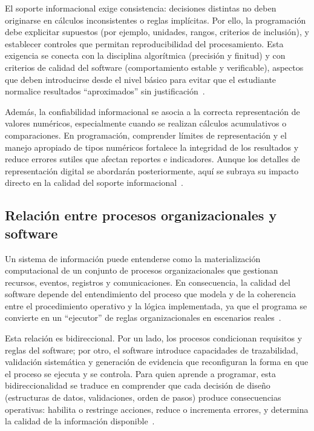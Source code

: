 \documentclass[12pt,twoside]{book}
\begin{document}
						El soporte informacional exige consistencia: decisiones distintas no deben originarse en cálculos inconsistentes o reglas implícitas. Por ello, la programación debe explicitar supuestos (por ejemplo, unidades, rangos, criterios de inclusión), y establecer controles que permitan reproducibilidad del procesamiento. Esta exigencia se conecta con la disciplina algorítmica (precisión y finitud) y con criterios de calidad del software (comportamiento estable y verificable), aspectos que deben introducirse desde el nivel básico para evitar que el estudiante normalice resultados “aproximados” sin justificación~\cite{Wirth1976Algorithms,Ghezzi2003Fundamentals,Fitzpatrick2004Software}.
						
						Además, la confiabilidad informacional se asocia a la correcta representación de valores numéricos, especialmente cuando se realizan cálculos acumulativos o comparaciones. En programación, comprender límites de representación y el manejo apropiado de tipos numéricos fortalece la integridad de los resultados y reduce errores sutiles que afectan reportes e indicadores. Aunque los detalles de representación digital se abordarán posteriormente, aquí se subraya su impacto directo en la calidad del soporte informacional~\cite{IEEE2019Standard754,Goldberg1991What,Gaddis2022Starting}.
					
				\subsection{Relación entre procesos organizacionales y software}
					\noindent
					Un sistema de información puede entenderse como la materialización computacional de un conjunto de procesos organizacionales que gestionan recursos, eventos, registros y comunicaciones. En consecuencia, la calidad del software depende del entendimiento del proceso que modela y de la coherencia entre el procedimiento operativo y la lógica implementada, ya que el programa se convierte en un “ejecutor” de reglas organizacionales en escenarios reales~\cite{Kendall2014Systems,Laudon2020Management,Tegarden2025Systems}.
					
					Esta relación es bidireccional. Por un lado, los procesos condicionan requisitos y reglas del software; por otro, el software introduce capacidades de trazabilidad, validación sistemática y generación de evidencia que reconfiguran la forma en que el proceso se ejecuta y se controla. Para quien aprende a programar, esta bidireccionalidad se traduce en comprender que cada decisión de diseño (estructuras de datos, validaciones, orden de pasos) produce consecuencias operativas: habilita o restringe acciones, reduce o incrementa errores, y determina la calidad de la información disponible~\cite{Laudon2020Management,Ghezzi2003Fundamentals,Gonzalez-Longatt2007Introduccion}.
					
\end{document}

